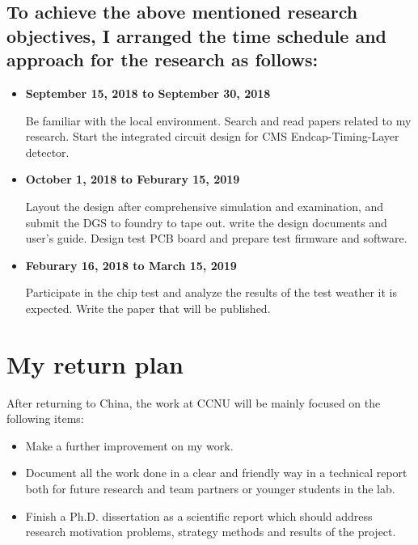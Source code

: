 \documentclass[11pt,a4paper]{article}
\begin{document}
\begin{spacing}{1.2}
\subsection*{To achieve the above mentioned research objectives, I arranged the time schedule and approach for the research as follows:}
\begin{itemize}
    \item \textbf{September 15, 2018 to September 30, 2018}

Be familiar with the local environment. Search and read papers related to my research. Start the integrated circuit design for CMS Endcap-Timing-Layer detector.
    \item \textbf{October 1, 2018 to Feburary 15, 2019}
    
Layout the design after comprehensive simulation and examination, and submit the DGS to foundry to tape out. write the design documents and user's guide. Design test PCB board and prepare test firmware and software.
    \item \textbf{Feburary 16, 2018 to March 15, 2019}

Participate in the chip test and analyze the results of the test weather it is expected. Write the paper that will be published.
\end{itemize}

\section*{My return plan}     %

After returning to China, the work at CCNU will be mainly focused on the following items:
\begin{itemize}
    \item Make a further improvement on my work.
    \item Document all the work done in a clear and friendly way in a technical report both for future research and team partners or younger students in the lab.
    \item Finish a Ph.D. dissertation as a scientific report which should address research motivation problems, strategy methods and results of the project.
\end{itemize}

\vspace{1cm}


\vspace{0.5cm}
\end{spacing}
\end{document}
